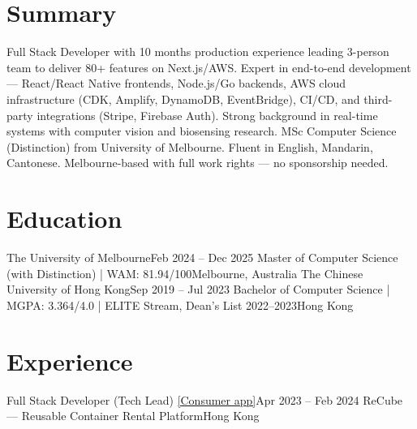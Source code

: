 \documentclass[letterpaper,11pt]{article}
\begin{document}
\makecvheader

\section{Summary}
\small{
Full Stack Developer with 10 months production experience leading 3-person team to deliver 80+ features on Next.js/AWS. Expert in end-to-end development — React/React Native frontends, Node.js/Go backends, AWS cloud infrastructure (CDK, Amplify, DynamoDB, EventBridge), CI/CD, and third-party integrations (Stripe, Firebase Auth). Strong background in real-time systems with computer vision and biosensing research. MSc Computer Science (Distinction) from University of Melbourne. Fluent in English, Mandarin, Cantonese. Melbourne-based with full work rights — no sponsorship needed.
}

\section{Education}
  \resumeSubHeadingListStart
    \resumeSubheading
      {The University of Melbourne}{Feb 2024 -- Dec 2025}
      {Master of Computer Science (with Distinction) | WAM: 81.94/100}{Melbourne, Australia}
    \resumeSubheading
      {The Chinese University of Hong Kong}{Sep 2019 -- Jul 2023}
      {Bachelor of Computer Science | MGPA: 3.364/4.0 | ELITE Stream, Dean's List 2022--2023}{Hong Kong}
  \resumeSubHeadingListEnd

\section{Experience}
  \resumeSubHeadingListStart
    \resumeSubheading
      {Full Stack Developer (Tech Lead) \href{https://app.recube.hk/}{[Consumer app]}}{Apr 2023 -- Feb 2024}
      {ReCube — Reusable Container Rental Platform}{Hong Kong}
      \resumeItemListStart
      \resumeItemListEnd
  \resumeSubHeadingListEnd
\end{document}
